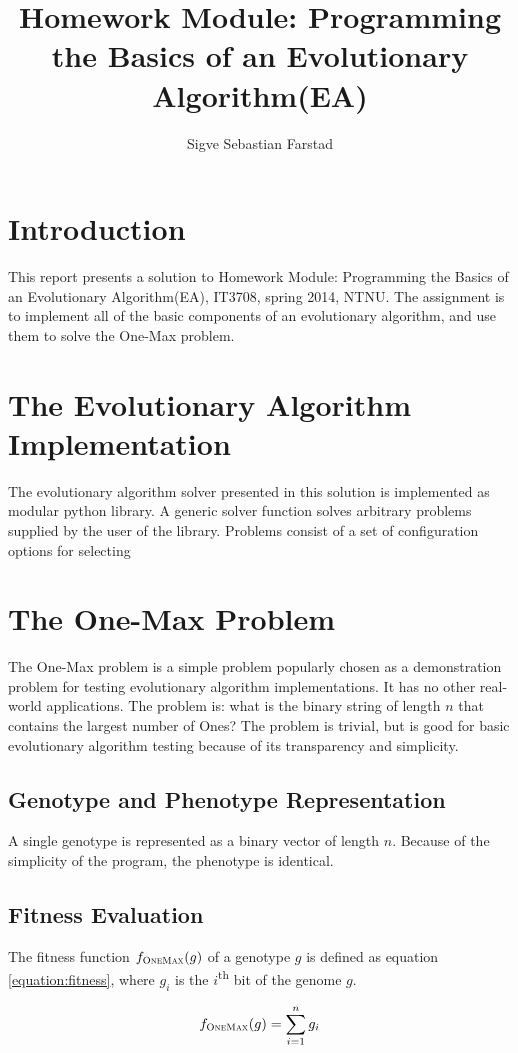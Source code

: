 \documentclass{article}
\title{Homework Module: \textbf{Programming the Basics of an Evolutionary Algorithm(EA)}}
\author{Sigve Sebastian Farstad}
\begin{document}
\maketitle

\section{Introduction}

This report presents a solution to Homework Module: Programming the Basics of an Evolutionary Algorithm(EA), IT3708, spring 2014, NTNU.
The assignment is to implement all of the basic components of an evolutionary algorithm, and use them to solve the One-Max problem.

\section{The Evolutionary Algorithm Implementation}

The evolutionary algorithm solver presented in this solution is implemented as modular python library.
A generic solver function solves arbitrary problems supplied by the user of the library.
Problems consist of a set of configuration options for selecting 

\section{The One-Max Problem}

The One-Max problem is a simple problem popularly chosen as a demonstration problem for testing evolutionary algorithm implementations.
It has no other real-world applications.
The problem is: what is the binary string of length $ n $ that contains the largest number of Ones?
The problem is trivial, but is good for basic evolutionary algorithm testing because of its transparency and simplicity.

\subsection{Genotype and Phenotype Representation}

A single genotype is represented as a binary vector of length $ n $.
Because of the simplicity of the program, the phenotype is identical.

\subsection{Fitness Evaluation}

The fitness function $ f_{\textsc{OneMax}}(g) $ of a genotype $ g $ is defined as equation \ref{equation:fitness}, where $ g_i $ is the $ i $\textsuperscript{th} bit of the genome $ g $.

\begin{equation}\label{equation:fitness}
f_{\textsc{OneMax}}(g) = \sum_{i=1}^{n} g_i
\end{equation}
\end{document}
